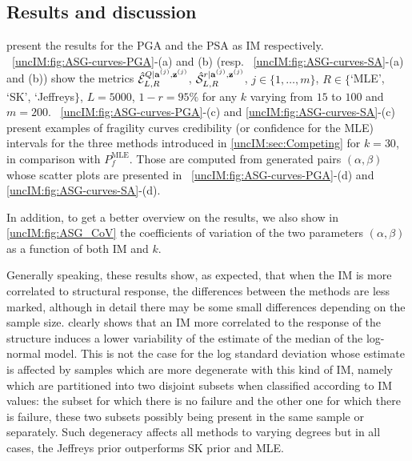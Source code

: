 \subsection{Results and discussion}    
    
    present the results for the PGA and the PSA as IM respectively. ~\ref{uncIM:fig:ASG-curves-PGA}-(a) and (b) (resp. ~\ref{uncIM:fig:ASG-curves-SA}-(a) and (b)) show the metrics  $\hat{\mathcal{E}}_{L,R}^{Q|\mathbf{a}^{(j)},\mathbf{z}^{(j)}}$, $\hat{\mathcal{S}}_{L,R}^{r|\mathbf{a}^{(j)},\mathbf{z}^{(j)}}$, $j\in\{1,\dots,m\}$, $R\in\{$`MLE', `SK', `Jeffreys$\}$, $L=5000$, $1-r=95\%$ for any $k$ varying from $15$ to $100$ and $m=200$. ~\ref{uncIM:fig:ASG-curves-PGA}-(c) and \ref{uncIM:fig:ASG-curves-SA}-(c) present examples of fragility curves credibility (or confidence for the MLE) intervals for the three methods introduced in \cref{uncIM:sec:Competing} for $k = 30$, in comparison with $P_f^{\mathrm{MLE}}$. 
   Those are computed from generated pairs $(\alpha,\beta)$ whose scatter plots are presented in ~\ref{uncIM:fig:ASG-curves-PGA}-(d) and \ref{uncIM:fig:ASG-curves-SA}-(d).
   
   In addition, to get a better overview on the results, we also show in \cref{uncIM:fig:ASG_CoV} the coefficients of variation of the two parameters $(\alpha , \beta)$ as a function of both IM and $k$.
   
   Generally speaking, these results show, as expected, that when the IM is more correlated to structural response, the differences between the methods are less marked, although in detail there may be some small differences depending on the sample size. { clearly shows that an IM more correlated to the response of the structure induces a lower variability of the estimate of the median of the log-normal model. This is not the case for the log standard deviation whose estimate is affected by samples which are more degenerate with this kind of IM, namely which are partitioned into two disjoint subsets when classified according to IM values: the subset for which there is no failure and the other one for which there is failure, these two subsets possibly being present in the same sample or separately. Such degeneracy affects all methods to varying degrees but in all cases, the Jeffreys prior outperforms SK prior and MLE.}
   
